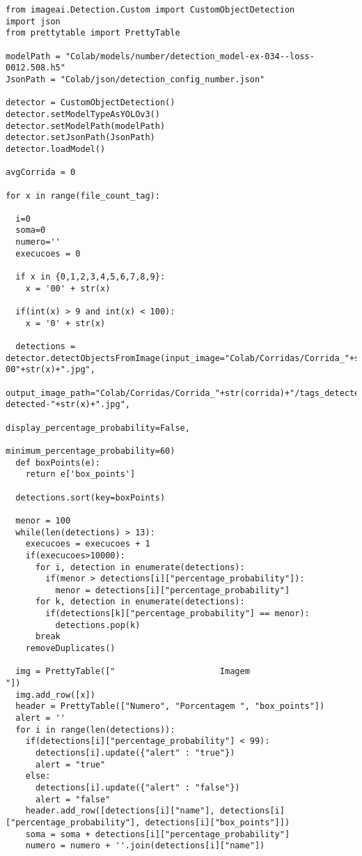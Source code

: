
\begin{lstlisting}[caption=Identificando os números nas imagens com \textit{barcodes} individuais, label=ap:identNumber]
from imageai.Detection.Custom import CustomObjectDetection
import json
from prettytable import PrettyTable

modelPath = "Colab/models/number/detection_model-ex-034--loss-0012.508.h5"
JsonPath = "Colab/json/detection_config_number.json"

detector = CustomObjectDetection()
detector.setModelTypeAsYOLOv3()
detector.setModelPath(modelPath)
detector.setJsonPath(JsonPath)
detector.loadModel()

avgCorrida = 0

for x in range(file_count_tag):

  i=0
  soma=0
  numero=''
  execucoes = 0

  if x in {0,1,2,3,4,5,6,7,8,9}:
    x = '00' + str(x)
  
  if(int(x) > 9 and int(x) < 100):
    x = '0' + str(x)

  detections = detector.detectObjectsFromImage(input_image="Colab/Corridas/Corrida_"+str(corrida)+"/tags_images/barcode-00"+str(x)+".jpg", 
                                          output_image_path="Colab/Corridas/Corrida_"+str(corrida)+"/tags_detected/digit-detected-"+str(x)+".jpg", 
                                          display_percentage_probability=False, 
                                          minimum_percentage_probability=60)
  def boxPoints(e):
    return e['box_points']

  detections.sort(key=boxPoints)

  menor = 100
  while(len(detections) > 13):
    execucoes = execucoes + 1
    if(execucoes>10000):
      for i, detection in enumerate(detections):
        if(menor > detections[i]["percentage_probability"]):
          menor = detections[i]["percentage_probability"]   
      for k, detection in enumerate(detections):
        if(detections[k]["percentage_probability"] == menor):
          detections.pop(k)
      break
    removeDuplicates()

  img = PrettyTable(["                     Imagem                    "])
  img.add_row([x])
  header = PrettyTable(["Numero", "Porcentagem ", "box_points"])
  alert = ''
  for i in range(len(detections)):
    if(detections[i]["percentage_probability"] < 99):
      detections[i].update({"alert" : "true"})
      alert = "true"
    else:
      detections[i].update({"alert" : "false"})
      alert = "false"
    header.add_row([detections[i]["name"], detections[i]["percentage_probability"], detections[i]["box_points"]])
    soma = soma + detections[i]["percentage_probability"]
    numero = numero + ''.join(detections[i]["name"])


\end{lstlisting}
